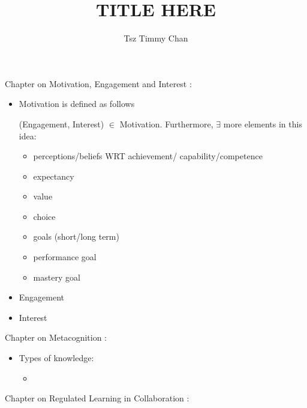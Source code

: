 \documentclass{TC}
\title{TITLE HERE}	%
\author{Tsz Timmy Chan}	%
\begin{document}
Chapter on Motivation, Engagement and Interest \parencite{fischer_motivation_2018}:
\begin{itemize}
\item Motivation is defined as follows 
\begin{definition}[Motivation]
(Engagement, Interest) $\in$ Motivation. Furthermore, $\exists$ more elements in this idea:
	\begin{multicols}{2}	
	\begin{itemize}
	\item perceptions/beliefs WRT achievement/ capability/competence
	\item expectancy
	\item value
	\item choice
	\item goals (short/long term)
	\item performance goal
	\item mastery goal
	\end{itemize}
	\end{multicols}
\end{definition}

\item Engagement
\item Interest
\end{itemize}

Chapter on Metacognition \parencite{sawyer_metacognition_2014}:
\begin{itemize}
\item Types of knowledge:
	\begin{itemize}
	\item 
	\end{itemize}
\end{itemize}

Chapter on Regulated Learning in Collaboration \parencite{fischer_contemporary_2018}: 
\end{document}
